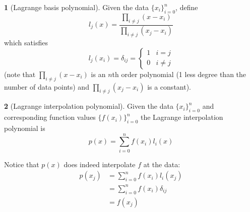 \documentclass[12pt]{article}
\theoremstyle{definition}
\newtheorem{definition}{\color{NavyBlue}{\textbf{Definition}}}
\theoremstyle{definition}
\begin{document}
\begin{definition}[Lagrange basis polynomial]
Given the data $\{x_i\}_{i=0}^n$, define
\begin{equation}
	l_j(x) = \frac{\prod_{i\neq j} (x-x_i)}{\prod_{i\neq j} (x_j-x_i)}
\end{equation}
which satisfies
\begin{equation}
	l_j(x_i) = \delta_{ij} =
	\begin{cases}
	1 & i=j \\
	0 & i\neq j
	\end{cases}
\end{equation}
(note that $\prod_{i\neq j} (x-x_i)$ is an $n$th order polynomial (1 less degree than the number of data points) and $\prod_{i\neq j} (x_j-x_i)$ is a constant).
\end{definition}

\begin{definition}[Lagrange interpolation polynomial]
	Given the data $\{x_i\}_{i=0}^n$ and corresponding function values $\{f(x_i)\}_{i=0}^n$ the Lagrange interpolation polynomial is 
	\begin{equation}
		p(x) = \sum_{i=0}^n f(x_i) l_i(x)
	\end{equation}
\end{definition}
Notice that $p(x)$ does indeed interpolate $f$ at the data:
\begin{align*}
	p(x_j) &= \sum_{i=0}^n f(x_i) l_i(x_j) \\
	&= \sum_{i=0}^n f(x_i) \delta_{ij} \\
	&= f(x_j)
\end{align*}
\end{document}
